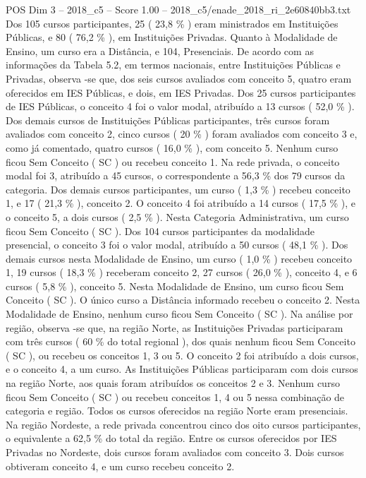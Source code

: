 \begin{textsample}{POS Dim 3 – 2018\_c5 – Score 1.00 – 2018\_c5/enade\_2018\_ri\_2e60840bb3.txt}
Dos 105 cursos participantes, 25 ( 23,8 \% ) eram ministrados em Instituições Públicas, e 80 ( 76,2 \% ), em Instituições Privadas.
Quanto à Modalidade de Ensino, um curso era a Distância, e 104, Presenciais.
De acordo com as informações da Tabela 5.2, em termos nacionais, entre Instituições Públicas e Privadas, observa -se que, dos seis cursos avaliados com conceito 5, quatro eram oferecidos em IES Públicas, e dois, em IES Privadas.
Dos 25 cursos participantes de IES Públicas, o conceito 4 foi o valor modal, atribuído a 13 cursos ( 52,0 \% ).
Dos demais cursos de Instituições Públicas participantes, três cursos foram avaliados com conceito 2, cinco cursos ( 20 \% ) foram avaliados com conceito 3 e, como já comentado, quatro cursos ( 16,0 \% ), com conceito 5.
Nenhum curso ficou Sem Conceito ( SC ) ou recebeu conceito 1.
Na rede privada, o conceito modal foi 3, atribuído a 45 cursos, o correspondente a 56,3 \% dos 79 cursos da categoria.
Dos demais cursos participantes, um curso ( 1,3 \% ) recebeu conceito 1, e 17 ( 21,3 \% ), conceito 2.
O conceito 4 foi atribuído a 14 cursos ( 17,5 \% ), e o conceito 5, a dois cursos ( 2,5 \% ).
Nesta Categoria Administrativa, um curso ficou Sem Conceito ( SC ).
Dos 104 cursos participantes da modalidade presencial, o conceito 3 foi o valor modal, atribuído a 50 cursos ( 48,1 \% ).
Dos demais cursos nesta Modalidade de Ensino, um curso ( 1,0 \% ) recebeu conceito 1, 19 cursos ( 18,3 \% ) receberam conceito 2, 27 cursos ( 26,0 \% ), conceito 4, e 6 cursos ( 5,8 \% ), conceito 5.
Nesta Modalidade de Ensino, um curso ficou Sem Conceito ( SC ).
O único curso a Distância informado recebeu o conceito 2.
Nesta Modalidade de Ensino, nenhum curso ficou Sem Conceito ( SC ).
Na análise por região, observa -se que, na região Norte, as Instituições Privadas participaram com três cursos ( 60 \% do total regional ), dos quais nenhum ficou Sem Conceito ( SC ), ou recebeu os conceitos 1, 3 ou 5.
O conceito 2 foi atribuído a dois cursos, e o conceito 4, a um curso.
As Instituições Públicas participaram com dois cursos na região Norte, aos quais foram atribuídos os conceitos 2 e 3.
Nenhum curso ficou Sem Conceito ( SC ) ou recebeu conceitos 1, 4 ou 5 nessa combinação de categoria e região.
Todos os cursos oferecidos na região Norte eram presenciais.
Na região Nordeste, a rede privada concentrou cinco dos oito cursos participantes, o equivalente a 62,5 \% do total da região.
Entre os cursos oferecidos por IES Privadas no Nordeste, dois cursos foram avaliados com conceito 3.
Dois cursos obtiveram conceito 4, e um curso recebeu conceito 2.

\end{textsample}

